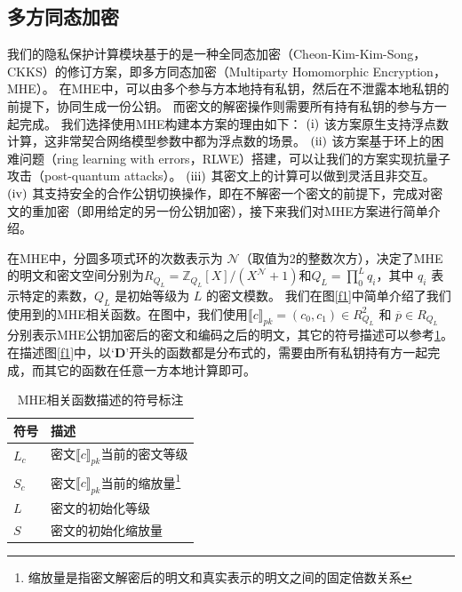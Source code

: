 \subsection{多方同态加密}
我们的隐私保护计算模块基于的是一种全同态加密（Cheon-Kim-Kim-Song，CKKS\cite{cheon2017homomorphic}）的修订方案，即多方同态加密（Multiparty Homomorphic Encryption，MHE）。
在MHE中，可以由多个参与方本地持有私钥，然后在不泄露本地私钥的前提下，协同生成一份公钥。
而密文的解密操作则需要所有持有私钥的参与方一起完成。
我们选择使用MHE构建本方案的理由如下：
$(\rm \romannumeral1)$ 该方案原生支持浮点数计算，这非常契合网络模型参数中都为浮点数的场景。
$(\rm \romannumeral2)$ 该方案基于环上的困难问题（ring learning with errors，RLWE）搭建，可以让我们的方案实现抗量子攻击（post-quantum attacks）。
$(\rm \romannumeral3)$ 其密文上的计算可以做到灵活且非交互。
$(\rm \romannumeral4)$ 其支持安全的合作公钥切换操作，即在不解密一个密文的前提下，完成对密文的重加密（即用给定的另一份公钥加密），接下来我们对MHE方案进行简单介绍。

在MHE中，分圆多项式环的次数表示为 $\mathcal{N}$（取值为2的整数次方），决定了MHE的明文和密文空间分别为$R_{Q_{L}}=\mathbb{Z}_{Q_{L}}[X]/(X^{\mathcal{N}}+1)$和$Q_{L}=\prod_{0}^{L}q_i$，其中 $q_i$ 表示特定的素数，$Q_L$ 是初始等级为 $L$ 的密文模数。
我们在图\ref{f1}中简单介绍了我们使用到的MHE相关函数。在图中，我们使用$\llbracket c\rrbracket_{pk}=(c_0,c_1)\in R^2_{Q_{L}}$ 和 $\overline{p}\in R_{Q_{L}}$ 分别表示MHE公钥加密后的密文和编码之后的明文，其它的符号描述可以参考\ref{tab:symbol}。
在描述图\ref{f1}中，以$‘\textbf{D}’$开头的函数都是分布式的，需要由所有私钥持有方一起完成，而其它的函数在任意一方本地计算即可。

\begin{table}[htbp]
	\centering
	\begin{minipage}[t]{0.6\linewidth}
		\caption{MHE相关函数描述的符号标注}
		\label{tab:symbol}
		\begin{tabular*}{\linewidth}{lp{10cm}}
			\toprule[1.5pt]
			{\hei 符号} & {\hei 描述}\\
			\midrule[1pt]
			$L_c$ & 密文$\llbracket c\rrbracket_{pk}$当前的密文等级 \\ 
			$S_c$ & 密文$\llbracket c\rrbracket_{pk}$当前的缩放量\footnote{缩放量是指密文解密后的明文和真实表示的明文之间的固定倍数关系} \\
			$L$ & 密文的初始化等级\\
			$S$ & 密文的初始化缩放量\\
			\bottomrule[1.5pt]
		\end{tabular*}
	\end{minipage}
\end{table}

